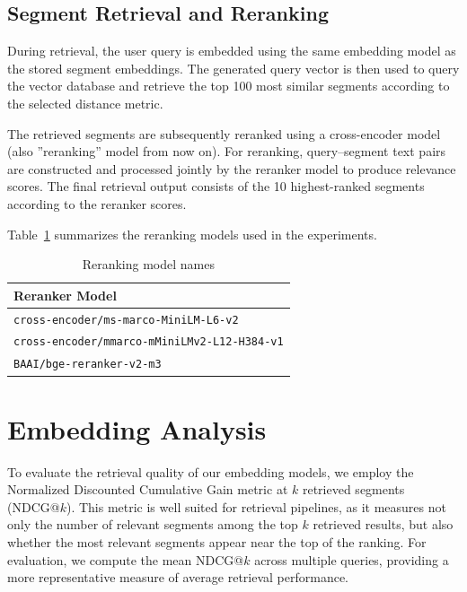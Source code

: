 \documentclass[conference]{IEEEtran}
\begin{document}
\subsection{Segment Retrieval and Reranking}

During retrieval, the user query is embedded using the same embedding model as the stored segment embeddings. The generated query vector is then used to query the vector database and retrieve the top 100 most similar segments according to the selected distance metric. 

The retrieved segments are subsequently reranked using a cross-encoder model (also ''reranking'' model from now on). For reranking, query--segment text pairs are constructed and processed jointly by the reranker model to produce relevance scores. The final retrieval output consists of the 10 highest-ranked segments according to the reranker scores.

Table~\ref{tab:reranker_models} summarizes the reranking models used in the experiments.

\begin{table}[h]
\centering
\caption{Reranking model names}
\label{tab:reranker_models}
\begin{tabular}{|l|}
\hline
\textbf{Reranker Model} \\
\hline
\texttt{cross-encoder/ms-marco-MiniLM-L6-v2} \\
\texttt{cross-encoder/mmarco-mMiniLMv2-L12-H384-v1} \\
\texttt{BAAI/bge-reranker-v2-m3} \\
\hline
\end{tabular}
\end{table}







\section{Embedding Analysis}

To evaluate the retrieval quality of our embedding models, we employ the Normalized Discounted Cumulative Gain metric at \(k\) retrieved segments (NDCG@\(k\)). This metric is well suited for retrieval pipelines, as it measures not only the number of relevant segments among the top \(k\) retrieved results, but also whether the most relevant segments appear near the top of the ranking. For evaluation, we compute the mean NDCG@\(k\) across multiple queries, providing a more representative measure of average retrieval performance.
\end{document}
